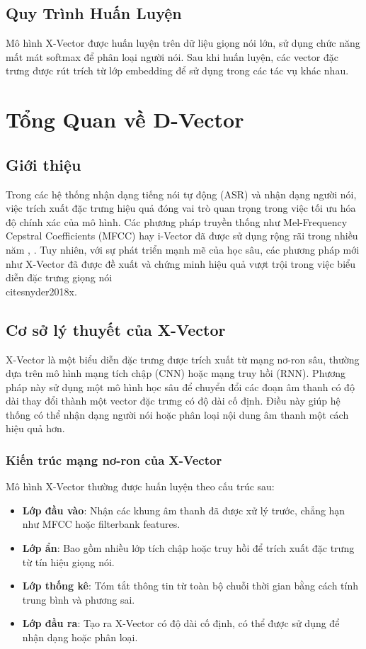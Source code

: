 \documentclass{article}
\begin{document}
\subsection{Quy Trình Huấn Luyện}

Mô hình X-Vector được huấn luyện trên dữ liệu giọng nói lớn, sử dụng chức năng mất mát softmax để phân loại người nói.
Sau khi huấn luyện, các vector đặc trưng được rút trích từ lớp embedding để sử dụng trong các tác vụ khác nhau.

\section{Tổng Quan về D-Vector}
\subsection{Giới thiệu}
Trong các hệ thống nhận dạng tiếng nói tự động (ASR) và nhận dạng người nói, việc trích xuất đặc trưng hiệu quả đóng vai trò quan trọng trong việc tối ưu hóa độ chính xác của mô hình. Các phương pháp truyền thống như Mel-Frequency Cepstral Coefficients (MFCC) hay i-Vector đã được sử dụng rộng rãi trong nhiều năm \cite{dehak2011front}, \cite{davis1980comparison}. Tuy nhiên, với sự phát triển mạnh mẽ của học sâu, các phương pháp mới như X-Vector đã được đề xuất và chứng minh hiệu quả vượt trội trong việc biểu diễn đặc trưng giọng nói \\cite{snyder2018x}.

\subsection{Cơ sở lý thuyết của X-Vector}

X-Vector là một biểu diễn đặc trưng được trích xuất từ mạng nơ-ron sâu, thường dựa trên mô hình mạng tích chập (CNN) hoặc mạng truy hồi (RNN). Phương pháp này sử dụng một mô hình học sâu để chuyển đổi các đoạn âm thanh có độ dài thay đổi thành một vector đặc trưng có độ dài cố định. Điều này giúp hệ thống có thể nhận dạng người nói hoặc phân loại nội dung âm thanh một cách hiệu quả hơn.

\subsubsection{Kiến trúc mạng nơ-ron của X-Vector}

Mô hình X-Vector thường được huấn luyện theo cấu trúc sau:

\begin{itemize}
    \item \textbf{Lớp đầu vào}: Nhận các khung âm thanh đã được xử lý trước, chẳng hạn như MFCC hoặc filterbank features.
    \item \textbf{Lớp ẩn}: Bao gồm nhiều lớp tích chập hoặc truy hồi để trích xuất đặc trưng từ tín hiệu giọng nói.
    \item \textbf{Lớp thống kê}: Tóm tắt thông tin từ toàn bộ chuỗi thời gian bằng cách tính trung bình và phương sai.
    \item \textbf{Lớp đầu ra}: Tạo ra X-Vector có độ dài cố định, có thể được sử dụng để nhận dạng hoặc phân loại.
\end{itemize}
\end{document}
